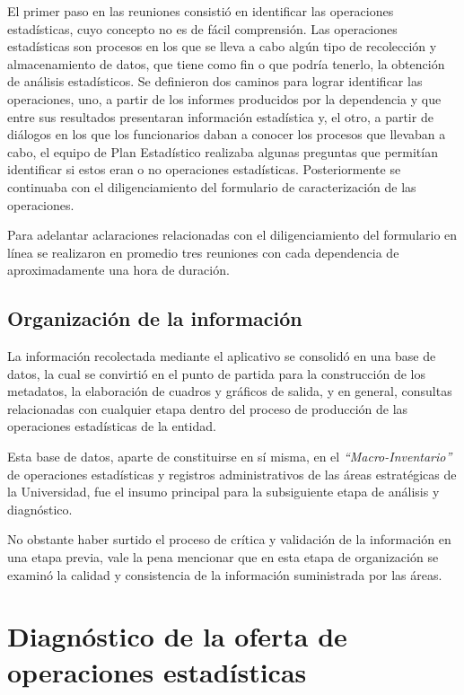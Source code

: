 \documentclass[
]{book}
\begin{document}
El primer paso en las reuniones consistió en identificar las operaciones estadísticas, cuyo concepto no es de
fácil comprensión. Las operaciones estadísticas son procesos en los que se lleva a cabo algún tipo de
recolección y almacenamiento de datos, que tiene como fin o que podría tenerlo, la obtención de
análisis estadísticos. Se definieron dos caminos para lograr identificar las operaciones, uno, a partir de
los informes producidos por la dependencia y que entre sus resultados presentaran información
estadística y, el otro, a partir de diálogos en los que los funcionarios daban a conocer los procesos
que llevaban a cabo, el equipo de Plan Estadístico realizaba algunas preguntas que permitían
identificar si estos eran o no operaciones estadísticas. Posteriormente se continuaba con el
diligenciamiento del formulario de caracterización de las operaciones.

Para adelantar aclaraciones relacionadas con el diligenciamiento del formulario en línea se
realizaron en promedio tres reuniones con cada dependencia de aproximadamente una hora de
duración.

\hypertarget{organizaciuxf3n-de-la-informaciuxf3n}{%
\subsection{Organización de la información}\label{organizaciuxf3n-de-la-informaciuxf3n}}

La información recolectada mediante el aplicativo se consolidó en una base de datos, la cual se convirtió en el
punto de partida para la construcción de los metadatos, la elaboración de cuadros y gráficos de
salida, y en general, consultas relacionadas con cualquier etapa dentro del proceso de producción
de las operaciones estadísticas de la entidad.

Esta base de datos, aparte de constituirse en sí misma, en el \emph{``Macro-Inventario''} de operaciones
estadísticas y registros administrativos de las áreas estratégicas de la Universidad, fue el insumo
principal para la subsiguiente etapa de análisis y diagnóstico.

No obstante haber surtido el proceso de crítica y validación de la información en una etapa previa,
vale la pena mencionar que en esta etapa de organización se examinó la calidad y
consistencia de la información suministrada por las áreas.

\hypertarget{diagnuxf3stico-de-la-oferta-de-operaciones-estaduxedsticas}{%
\section{Diagnóstico de la oferta de operaciones estadísticas}\label{diagnuxf3stico-de-la-oferta-de-operaciones-estaduxedsticas}}
\end{document}
